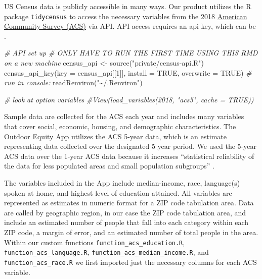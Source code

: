\documentclass[
]{book}
\newenvironment{Shaded}{\begin{snugshade}}{\end{snugshade}}
\newcommand{\AttributeTok}[1]{\textcolor[rgb]{0.77,0.63,0.00}{#1}}
\newcommand{\CommentTok}[1]{\textcolor[rgb]{0.56,0.35,0.01}{\textit{#1}}}
\newcommand{\ConstantTok}[1]{\textcolor[rgb]{0.00,0.00,0.00}{#1}}
\newcommand{\DecValTok}[1]{\textcolor[rgb]{0.00,0.00,0.81}{#1}}
\newcommand{\FunctionTok}[1]{\textcolor[rgb]{0.00,0.00,0.00}{#1}}
\newcommand{\NormalTok}[1]{#1}
\newcommand{\OtherTok}[1]{\textcolor[rgb]{0.56,0.35,0.01}{#1}}
\newcommand{\StringTok}[1]{\textcolor[rgb]{0.31,0.60,0.02}{#1}}
\begin{document}
US Census data is publicly accessible in many ways. Our product utilizes the R package \texttt{tidycensus} \citep{R-tidycensus} to access the necessary variables from the 2018 \href{https://www.census.gov/programs-surveys/acs/data.html}{American Community Survey (ACS)} via API. API access requires an api key, which can be .

\begin{Shaded}
\begin{Highlighting}[]
\CommentTok{\# API set up}
\CommentTok{\# ONLY HAVE TO RUN THE FIRST TIME USING THIS RMD on a new machine}
\NormalTok{census\_api }\OtherTok{\textless{}{-}} \FunctionTok{source}\NormalTok{(}\StringTok{"private/census{-}api.R"}\NormalTok{)}
\FunctionTok{census\_api\_key}\NormalTok{(}\AttributeTok{key =}\NormalTok{ census\_api[[}\DecValTok{1}\NormalTok{]], }\AttributeTok{install =} \ConstantTok{TRUE}\NormalTok{, }\AttributeTok{overwrite =} \ConstantTok{TRUE}\NormalTok{)}
\CommentTok{\# run in console:}
\FunctionTok{readRenviron}\NormalTok{(}\StringTok{"\textasciitilde{}/.Renviron"}\NormalTok{)}

\CommentTok{\# look at option variables}
\CommentTok{\#View(load\_variables(2018, "acs5", cache = TRUE))}
\end{Highlighting}
\end{Shaded}

Sample data are collected for the ACS each year and includes many variables that cover social, economic, housing, and demographic characteristics. The Outdoor Equity App utilizes the \href{https://www.census.gov/data/developers/data-sets/acs-5year.html}{ACS 5-year data}, which is an estimate representing data collected over the designated 5 year period. We used the 5-year ACS data over the 1-year ACS data because it increases ``statistical reliability of the data for less populated areas and small population subgroups'' \citep{ACS}.

The variables included in the App include median-income, race, language(s) spoken at home, and highest level of education attained. All variables are represented as estimates in numeric format for a ZIP code tabulation area. Data are called by geographic region, in our case the ZIP code tabulation area, and include an estimated number of people that fall into each category within each ZIP code, a margin of error, and an estimated number of total people in the area. Within our custom functions \texttt{function\_acs\_education.R}, \texttt{function\_acs\_language.R}, \texttt{function\_acs\_median\_income.R}, and \texttt{function\_acs\_race.R} we first imported just the necessary columns for each ACS variable.
\end{document}

